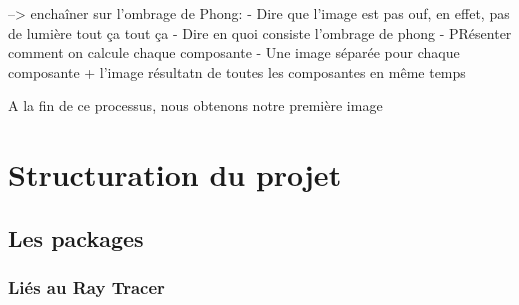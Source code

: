 \documentclass[11pt]{article}
\begin{document}
--> enchaîner sur l'ombrage de Phong:
	- Dire que l'image est pas ouf, en effet, pas de lumière tout ça tout ça
	- Dire en quoi consiste l'ombrage de phong
	- PRésenter comment on calcule chaque composante
	- Une image séparée pour chaque composante + l'image résultatn de toutes les composantes en même temps

A la fin de ce processus, nous obtenons notre première image 

\section{Structuration du projet}
\subsection{Les packages}
\subsubsection{Liés au Ray Tracer}
\end{document}
